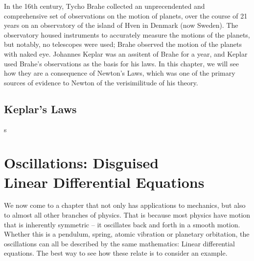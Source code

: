 In the 16th century, Tycho Brahe collected an unprecendented and comprehensive set of observations on the motion of planets, over the course of 21 years on an observatory of the island of Hven in Denmark (now Sweden). The observatory housed instruments to accurately measure the motions of the planets, but notably, no telescopes were used; Brahe observed the motion of the planets with naked eye. Johannes Keplar was an assitent of Brahe for a year, and Keplar used Brahe's observations as the basis for his laws. In this chapter, we will see how they are a consequence of Newton's Laws, which was one of the primary sources of evidence to Newton of the verisimilitude of his theory.

\section{Keplar's Laws}

s










\chapter{Oscillations: Disguised\\Linear Differential Equations}

We now come to a chapter that not only has applications to mechanics, but also to almost all other branches of physics. That is because most physics have motion that is inherently symmetric -- it oscillates back and forth in a smooth motion. Whether this is a pendulum, spring, atomic vibration or planetary orbitation, the oscillations can all be described by the same mathematics: Linear differential equations. The best way to see how these relate is to consider an example.

